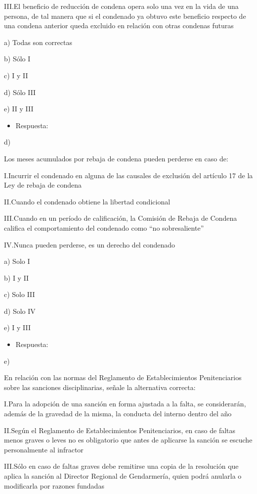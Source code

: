\documentclass[letterpaper, 11pt]{article}
\begin{document}
III.El beneficio de reducción de condena opera solo una vez en la vida de una
persona, de tal manera que si el condenado ya obtuvo este beneficio respecto de
una condena anterior queda excluido en relación con otras condenas futuras

a) Todas son correctas

b) Sólo I

c) I y II

d) Sólo III

e) II y III

\begin{itemize}
\item Respuesta:
\end{itemize}
d)



Los meses acumulados por rebaja de condena pueden perderse en caso de:

I.Incurrir el condenado en alguna de las causales de exclusión del artículo 17 de la
Ley de rebaja de condena

II.Cuando el condenado obtiene la libertad condicional

III.Cuando en un período de calificación, la Comisión de Rebaja de Condena califica el
comportamiento del condenado como “no sobresaliente”

IV.Nunca pueden perderse, es un derecho del condenado

a) Solo I

b) I y II

c) Solo III

d) Solo IV

e) I y III

\begin{itemize}
\item Respuesta:
\end{itemize}
e)


En relación con las normas del Reglamento de Establecimientos Penitenciarios
sobre las sanciones disciplinarias, señale la alternativa correcta:

I.Para la adopción de una sanción en forma ajustada a la falta, se considerarán,
además de la gravedad de la misma, la conducta del interno dentro del año

II.Según el Reglamento de Establecimientos Penitenciarios, en caso de faltas menos
graves o leves no es obligatorio que antes de aplicarse la sanción se escuche
personalmente al infractor

III.Sólo en caso de faltas graves debe remitirse una copia de la resolución que aplica
la sanción al Director Regional de Gendarmería, quien podrá anularla o modificarla
por razones fundadas
\end{document}

